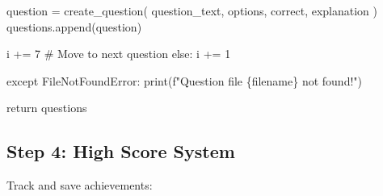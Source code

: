 \documentclass[
  letterpaper,
  DIV=11,
  numbers=noendperiod,
  oneside]{scrreprt}
\newenvironment{Shaded}{}{}
\newcommand{\BuiltInTok}[1]{\textcolor[rgb]{0.84,0.23,0.29}{#1}}
\newcommand{\CommentTok}[1]{\textcolor[rgb]{0.42,0.45,0.49}{#1}}
\newcommand{\ControlFlowTok}[1]{\textcolor[rgb]{0.84,0.23,0.29}{#1}}
\newcommand{\DecValTok}[1]{\textcolor[rgb]{0.00,0.36,0.77}{#1}}
\newcommand{\NormalTok}[1]{\textcolor[rgb]{0.14,0.16,0.18}{#1}}
\newcommand{\OperatorTok}[1]{\textcolor[rgb]{0.14,0.16,0.18}{#1}}
\newcommand{\PreprocessorTok}[1]{\textcolor[rgb]{0.84,0.23,0.29}{#1}}
\newcommand{\SpecialCharTok}[1]{\textcolor[rgb]{0.00,0.36,0.77}{#1}}
\newcommand{\SpecialStringTok}[1]{\textcolor[rgb]{0.01,0.18,0.38}{#1}}
\begin{document}
\begin{Shaded}
\begin{Highlighting}[]
\NormalTok{                question }\OperatorTok{=}\NormalTok{ create\_question(}
\NormalTok{                    question\_text, options, correct, explanation}
\NormalTok{                )}
\NormalTok{                questions.append(question)}
                
\NormalTok{                i }\OperatorTok{+=} \DecValTok{7}  \CommentTok{\# Move to next question}
            \ControlFlowTok{else}\NormalTok{:}
\NormalTok{                i }\OperatorTok{+=} \DecValTok{1}
                
    \ControlFlowTok{except} \PreprocessorTok{FileNotFoundError}\NormalTok{:}
        \BuiltInTok{print}\NormalTok{(}\SpecialStringTok{f"Question file }\SpecialCharTok{\{}\NormalTok{filename}\SpecialCharTok{\}}\SpecialStringTok{ not found!"}\NormalTok{)}
        
    \ControlFlowTok{return}\NormalTok{ questions}
\end{Highlighting}
\end{Shaded}

\subsection{Step 4: High Score System}\label{step-4-high-score-system}

Track and save achievements:
\end{document}
